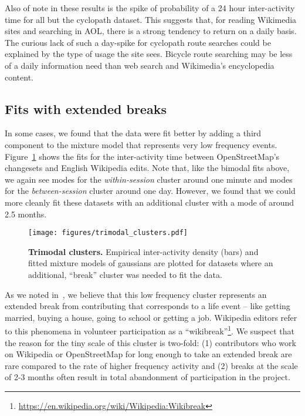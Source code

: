 Also of note in these results is the spike of probability of a 24 hour inter-activity time for all but the cyclopath dataset.  This suggests that, for reading Wikimedia sites and searching in AOL, there is a strong tendency to return on a daily basis.  The curious lack of such a day-spike for cyclopath route searches could be explained by the type of usage the site sees. Bicycle route searching may be less of a daily information need than web search and Wikimedia's encyclopedia content.

\subsection{Fits with extended breaks}

In some cases, we found that the data were fit better by adding a third component to the mixture model that represents very low frequency events.  Figure~\ref{fig:trimodal_clusters} shows the fits for the inter-activity time between OpenStreetMap's changesets and English Wikipedia edits.  Note that, like the bimodal fits above, we again see modes for the \emph{within-session} cluster around one minute and modes for the \emph{between-session} cluster around one day.  However, we found that we could more cleanly fit these datasets with an additional cluster with a mode of around 2.5 months.

\begin{figure}
\centering
\texttt{[image: figures/trimodal\_clusters.pdf]}
\caption{
    \textbf{Trimodal clusters.} Empirical inter-activity density (bars) and fitted mixture models of gaussians are plotted for datasets where an additional, ``break'' cluster was needed to fit the data.
}
\label{fig:trimodal_clusters}
\end{figure}

As we noted in~\cite{geiger2013using}, we believe that this low frequency cluster represents an extended break from contributing that corresponds to a life event -- like getting married, buying a house, going to school or getting a job.  Wikipedia editors refer to this phenomena in volunteer participation as a ``wikibreak''\footnote{\url{https://en.wikipedia.org/wiki/Wikipedia:Wikibreak}}.  We suspect that the reason for the tiny scale of this cluster is two-fold: (1) contributors who work on Wikipedia or OpenStreetMap for long enough to take an extended break are rare compared to the rate of higher frequency activity and (2) breaks at the scale of 2-3 months often result in total abandonment of participation in the project.


